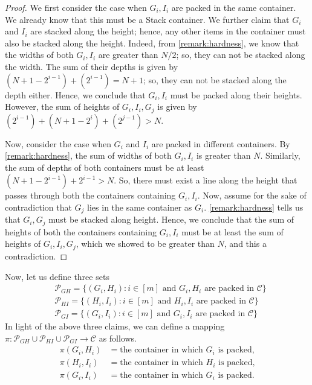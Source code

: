 \documentclass[10pt,a4paper]{amsart}
\theoremstyle{definition}
\begin{document}
\begin{proof}
    We first consider the case when $G_i,I_i$ are packed in the same container.
    We already know that this must be a Stack container. We further claim that $G_i$ and $I_i$ are stacked along the height; hence, any other items in the container must also be stacked along the height.
    Indeed, from \cref{remark:hardness}, we know that the widths of both $G_i,I_i$ are greater than $N/2$; so, they can not be stacked along the width. The sum of their depths is given by $(N+1-2^{i-1})+(2^{i-1})=N+1$; so, they can not be stacked along the depth either. Hence, we conclude that $G_i,I_i$ must be packed along their heights. However, the sum of heights of $G_i,I_i,G_j$ is given by $(2^{i-1})+(N+1-2^{i})+(2^{j-1})>N$.

    Now, consider the case when $G_i$ and $I_i$ are packed in different containers.
    By \cref{remark:hardness}, the sum of widths of both $G_i,I_i$ is greater than $N$. Similarly, the sum of depths of both containers must be at least $(N+1-2^{i-1})+2^{i-1}>N$.
    So, there must exist a line along the height that passes through both the containers containing $G_i,I_i$.
    Now, assume for the sake of contradiction that $G_j$ lies in the same container as $G_i$. \cref{remark:hardness} tells us that $G_i,G_j$ must be stacked along height.
    Hence, we conclude that the sum of heights of both the containers containing $G_i,I_i$ must be at least the sum of heights of $G_i,I_i,G_j$, which we showed to be greater than $N$,
    and this a contradiction.
\end{proof}
Now, let us define three sets
\begin{align*}
    &\mathcal P_{GH}=\{(G_i,H_i):i\in[m]\text{ and }G_i,H_i\text{ are packed in $\mathcal C$}\}\\
    &\mathcal P_{HI}=\{(H_i,I_i):i\in[m]\text{ and }H_i,I_i\text{ are packed in $\mathcal C$}\}\\
    &\mathcal P_{GI}=\{(G_i,I_i):i\in[m]\text{ and }G_i,I_i\text{ are packed in $\mathcal C$}\}
\end{align*}
In light of the above three claims, we can define a mapping $\pi:\mathcal P_{GH}\cup \mathcal P_{HI}\cup \mathcal P_{GI}\to \mathcal C$ as follows.
\begin{align*}
    \pi(G_i,H_i) &= \text{the container in which }G_i\text{ is packed,}\\
    \pi(H_i,I_i) &= \text{the container in which }H_i\text{ is packed,}\\
    \pi(G_i,I_i) &= \text{the container in which }G_i\text{ is packed.}
\end{align*}
\end{document}
